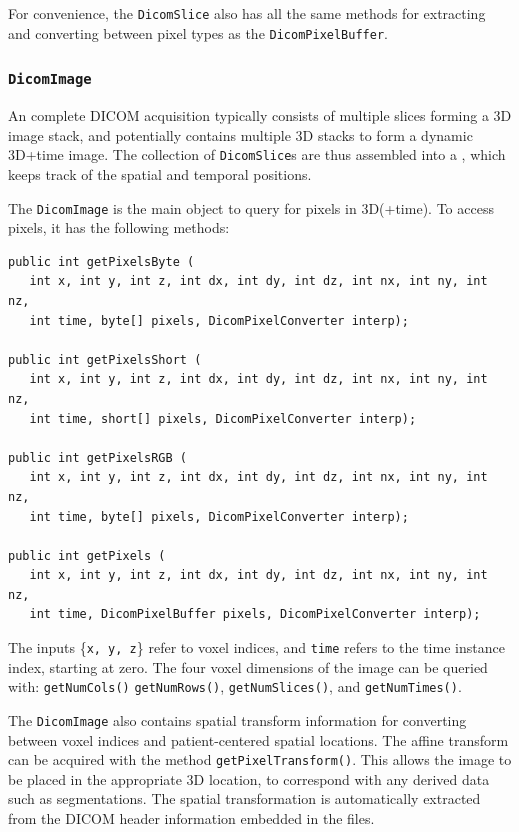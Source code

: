 For convenience, the \lstinline{DicomSlice} also has all the same methods 
for extracting and converting between pixel types as the \lstinline{DicomPixelBuffer}.

\subsubsection{\texttt{DicomImage}}

An complete DICOM acquisition typically consists of multiple slices forming a 3D image stack,
and potentially contains multiple 3D stacks to form a dynamic 3D+time image.  The collection
of \lstinline{DicomSlice}s are thus assembled into a , 
which keeps track of the spatial and temporal positions.

The \lstinline{DicomImage} is the main object to query for pixels in 3D(+time).  To access pixels,
it has the following methods:
\begin{lstlisting}[]
public int getPixelsByte (
   int x, int y, int z, int dx, int dy, int dz, int nx, int ny, int nz, 
   int time, byte[] pixels, DicomPixelConverter interp);

public int getPixelsShort (
   int x, int y, int z, int dx, int dy, int dz, int nx, int ny, int nz, 
   int time, short[] pixels, DicomPixelConverter interp);

public int getPixelsRGB (
   int x, int y, int z, int dx, int dy, int dz, int nx, int ny, int nz, 
   int time, byte[] pixels, DicomPixelConverter interp);

public int getPixels (
   int x, int y, int z, int dx, int dy, int dz, int nx, int ny, int nz, 
   int time, DicomPixelBuffer pixels, DicomPixelConverter interp);
\end{lstlisting}
The inputs \{\lstinline{x, y, z}\} refer to voxel indices, and \lstinline{time} refers to the time instance index, starting at zero.  The four voxel dimensions of the image can be queried with: \lstinline{getNumCols()} \lstinline{getNumRows()}, \lstinline{getNumSlices()}, and \lstinline{getNumTimes()}.

The \lstinline{DicomImage} also contains spatial transform information for converting between voxel indices and patient-centered spatial locations.  The affine transform can be acquired with the method \lstinline{getPixelTransform()}.  This allows the image to be placed in the appropriate 3D location, to correspond with any derived data such as segmentations.  The spatial transformation is automatically extracted from the DICOM header information embedded in the files.

